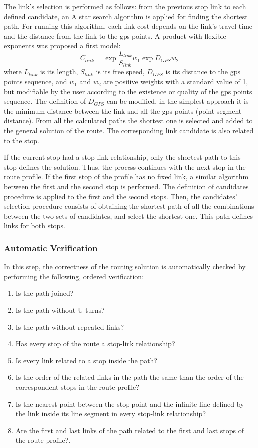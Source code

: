 The link's selection is performed as follows: from the previous stop link to each defined candidate, an A star search algorithm is applied for finding the shortest path. For running this algorithm, each link cost depends on the link's travel time and the distance from the link to the \gls{gps} points. A product with flexible exponents was proposed a first model:
%
\begin{equation}
\label{eq:LinkCost}
	C_{link} = \exp{\frac{L_{link}}{S_{link}}}{w_{1}}\exp{D_{GPS}}{w_{2}}
\end{equation}
%
where $L_{link}$ is its length, $S_{link}$ is its free speed, $D_{GPS}$ is its distance to the \gls{gps} points sequence, and $w_{1}$ and $w_{2}$ are positive weights with a standard value of 1, but modifiable by the user according to the existence or quality of the \gls{gps} points sequence. The definition of $D_{GPS}$ can be modified, in the simplest approach it is the minimum distance between the link and all the \gls{gps} points (point-segment distance). From all the calculated paths the shortest one is selected and added to the general solution of the route. The corresponding link candidate is also related to the stop. 

If the current stop had a stop-link relationship, only the shortest path to this stop defines the solution. Thus, the process continues with the next stop in the route profile. If the first stop of the profile has no fixed link, a similar algorithm between the first and the second stop is performed. The definition of candidates procedure is applied to the first and the second stops. Then, the candidates' selection procedure consists of obtaining the shortest path of all the combinations between the two sets of candidates, and select the shortest one. This path defines links for both stops.

\subsubsection{Automatic Verification}
In this step, the correctness of the routing solution is automatically checked by performing the following, ordered verification:
%
\begin{enumerate}
\item Is the path joined?
\item Is the path without U turns?
\item Is the path without repeated links?
\item Has every stop of the route a stop-link relationship?
\item Is every link related to a stop inside the path?
\item Is the order of the related links in the path the same than the order of the correspondent stops in the route profile?
\item Is the nearest point between the stop point and the infinite line defined by the link inside its line segment in every stop-link relationship?
\item Are the first and last links of the path related to the first and last  stops of the route profile?.
\end{enumerate}

